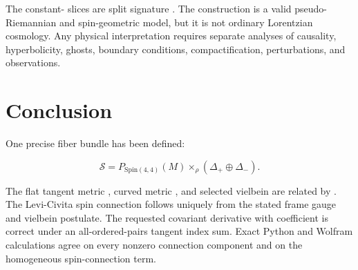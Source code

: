 \documentclass[11pt]{article}
\begin{document}
The constant-\texttt{} slices are split signature \texttt{}. The construction is a valid pseudo-Riemannian and spin-geometric model, but it is not ordinary Lorentzian cosmology. Any physical interpretation requires separate analyses of causality, hyperbolicity, ghosts, boundary conditions, compactification, perturbations, and observations.

\section{Conclusion}

One precise fiber bundle has been defined:

\[
\mathcal S=P_{\mathrm{Spin}(4,4)}(M)
\mathbin{\times}_{\rho}(\Delta_+\oplus\Delta_-).
\]

The flat tangent metric \texttt{}, curved metric \texttt{}, and selected vielbein \texttt{} are related by \texttt{}. The Levi-Civita spin connection follows uniquely from the stated frame gauge and vielbein postulate. The requested covariant derivative with coefficient \texttt{} is correct under an all-ordered-pairs tangent index sum. Exact Python and Wolfram calculations agree on every nonzero connection component and on the homogeneous \texttt{} spin-connection term.
\end{document}
